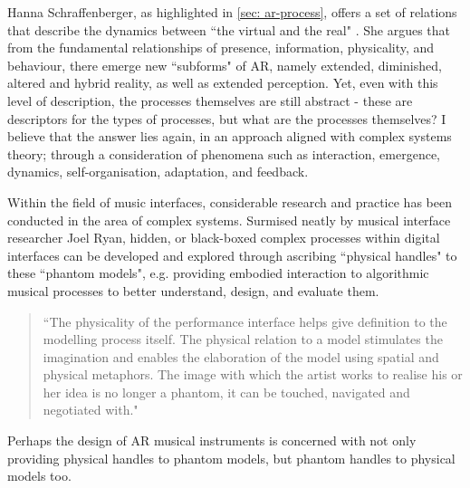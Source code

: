 Hanna Schraffenberger, as highlighted in \autoref{sec: ar-process}, offers a set of relations that describe the dynamics between ``the virtual and the real" \citeyearpar{schraffenberger2018}. She argues that from the fundamental relationships of presence, information, physicality, and behaviour, there emerge new ``subforms" of AR, namely extended, diminished, altered and hybrid reality, as well as extended perception. Yet, even with this level of description, the processes themselves are still abstract - these are descriptors for the types of processes, but what are the processes themselves? I believe that the answer lies again, in an approach aligned with complex systems theory; through a consideration of phenomena such as interaction, emergence, dynamics, self-organisation, adaptation, and feedback.

Within the field of music interfaces, considerable research and practice has been conducted in the area of complex systems. Surmised neatly by musical interface researcher Joel Ryan, hidden, or black-boxed complex processes within digital interfaces can be developed and explored through ascribing ``physical handles" to these ``phantom models", e.g. providing embodied interaction to algorithmic musical processes to better understand, design, and evaluate them.
\begin{quote}
    ``The physicality of the performance interface helps give definition to the modelling process itself. The physical relation to a model stimulates the imagination and enables the elaboration of the model using spatial and physical metaphors. The image with which the artist works to realise his or her idea is no longer a phantom, it can be touched, navigated and negotiated with." \citeyearpar[p.5]{ryan1991}
\end{quote}
Perhaps the design of AR musical instruments is concerned with not only providing physical handles to phantom models, but phantom handles to physical models too.

